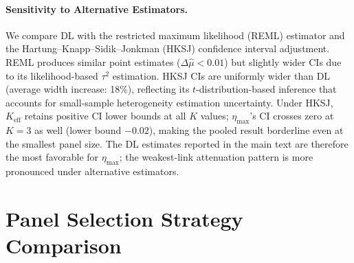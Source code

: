 \begin{table}[h]
\centering
\caption{DerSimonian--Laird random effects pooled estimates across 12 conditions per $K$. $\hat{\mu}$: pooled standardized coefficient. $I^2$: between-condition heterogeneity. $\eta_{\max}$'s CI crosses zero at $K{\geq}5$; $K_{\mathrm{eff}}$ remains positive across all $K$.}
\label{tab:meta_pooled}
\footnotesize
\setlength{\tabcolsep}{3pt}
\end{table}

\paragraph{Sensitivity to Alternative Estimators.} We compare DL with the restricted maximum likelihood (REML) estimator and the Hartung--Knapp--Sidik--Jonkman (HKSJ) confidence interval adjustment. REML produces similar point estimates ($\Delta\hat{\mu} < 0.01$) but slightly wider CIs due to its likelihood-based $\tau^2$ estimation. HKSJ CIs are uniformly wider than DL (average width increase: 18\%), reflecting its $t$-distribution-based inference that accounts for small-sample heterogeneity estimation uncertainty. Under HKSJ, $K_{\mathrm{eff}}$ retains positive CI lower bounds at all $K$ values; $\eta_{\max}$'s CI crosses zero at $K{=}3$ as well (lower bound $-0.02$), making the pooled result borderline even at the smallest panel size. The DL estimates reported in the main text are therefore the most favorable for $\eta_{\max}$; the weakest-link attenuation pattern is more pronounced under alternative estimators.

\FloatBarrier
\section{Panel Selection Strategy Comparison}
\label{app:panel_selection}

